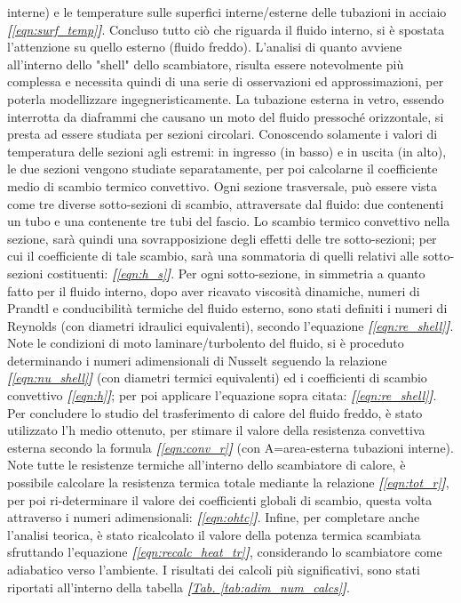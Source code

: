 \documentclass[a4paper,10pt]{article}                                                                                       %
\begin{document}
  interne) e le temperature sulle superfici interne/esterne delle tubazioni in acciaio
  \textit{\textbf{[}\ref{eqn:surf_temp}\textbf{]}}. Concluso tutto ciò che riguarda il fluido interno, si è spostata
  l'attenzione su quello esterno (fluido freddo). L'analisi di quanto avviene all'interno dello "shell" dello
  scambiatore, risulta essere notevolmente più complessa e necessita quindi di una serie di osservazioni ed
  approssimazioni, per poterla modellizzare ingegneristicamente. La tubazione esterna in vetro, essendo interrotta da
  diaframmi che causano un moto del fluido pressoché orizzontale, si presta ad essere studiata per sezioni circolari.
  Conoscendo solamente i valori di temperatura delle sezioni agli estremi: in ingresso (in basso) e in uscita (in alto),
  le due sezioni vengono studiate separatamente, per poi calcolarne il coefficiente medio di scambio termico convettivo.
  Ogni sezione trasversale, può essere vista come tre diverse sotto-sezioni di scambio, attraversate dal fluido: due
  contenenti un tubo e una contenente tre tubi del fascio. Lo scambio termico convettivo nella sezione, sarà quindi una
  sovrapposizione degli effetti delle tre sotto-sezioni; per cui il coefficiente di tale scambio, sarà una sommatoria
  di quelli relativi alle sotto-sezioni costituenti: \textit{\textbf{[}\ref{eqn:h_s}\textbf{]}}. Per ogni sotto-sezione,
  in simmetria a quanto fatto per il fluido interno, dopo aver ricavato viscosità dinamiche, numeri di Prandtl e
  conducibilità termiche del fluido esterno, sono stati definiti i numeri di Reynolds (con diametri idraulici equivalenti),
  secondo l'equazione \textit{\textbf{[}\ref{eqn:re_shell}\textbf{]}}. Note le condizioni di moto laminare/turbolento del
  fluido, si è proceduto determinando i numeri adimensionali di Nusselt seguendo la relazione
  \textit{\textbf{[}\ref{eqn:nu_shell}\textbf{]}} (con diametri termici equivalenti) ed i coefficienti di scambio
  convettivo \textit{\textbf{[}\ref{eqn:h}\textbf{]}}; per poi applicare l'equazione sopra citata:
  \textit{\textbf{[}\ref{eqn:re_shell}\textbf{]}}. Per concludere lo studio del trasferimento di calore del fluido freddo,
  è stato utilizzato l'h medio ottenuto, per stimare il valore della resistenza convettiva esterna secondo la formula
  \textit{\textbf{[}\ref{eqn:conv_r}\textbf{]}} (con A=area-esterna tubazioni interne). Note tutte le resistenze termiche
  all'interno dello scambiatore di calore, è possibile calcolare la resistenza termica totale mediante la relazione
  \textit{\textbf{[}\ref{eqn:tot_r}\textbf{]}}, per poi ri-determinare il valore dei coefficienti globali di scambio,
  questa volta attraverso i numeri adimensionali: \textit{\textbf{[}\ref{eqn:ohtc}\textbf{]}}. Infine, per completare
  anche l'analisi teorica, è stato ricalcolato il valore della potenza termica scambiata sfruttando l'equazione
  \textit{\textbf{[}\ref{eqn:recalc_heat_tr}\textbf{]}}, considerando lo scambiatore come adiabatico verso l'ambiente. I
  risultati dei calcoli più significativi, sono stati riportati all'interno della tabella
  \textit{\textbf{[}\hyperref[tab:adim_num_calcs]{Tab. }\ref{tab:adim_num_calcs}\textbf{]}}.
\clearpage                                                                                                                  %
\end{document}
